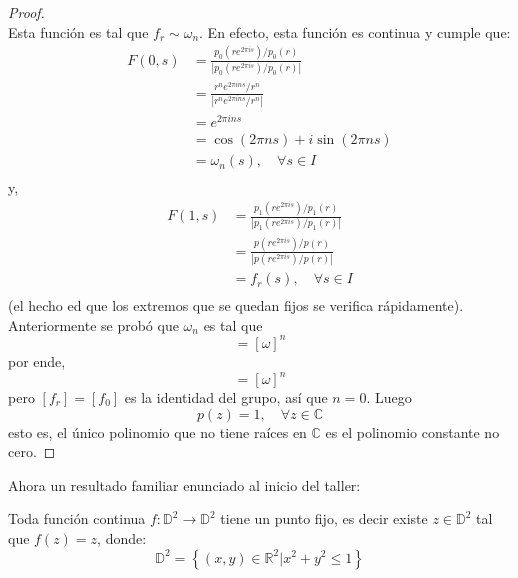\documentclass{article}
\newcounter{it}
\theoremstyle{largebreak}
\newcommand\abs[1]{\ensuremath{\left|#1\right|}}
\newcommand\cf[3]{\ensuremath{#1:#2\rightarrow#3}}
\begin{document}
\begin{proof}
\begin{equation*}
        \end{equation*}
        Esta función es tal que $f_r\sim\omega_n$. En efecto, esta función es continua y cumple que:
        \begin{equation*}
            \begin{split}
                F(0,s)&=\frac{p_0(re^{ 2\pi is})/p_0(r)}{\abs{p_0(re^{ 2\pi is})/p_0(r)}}\\
                &=\frac{r^n e^{ 2\pi ins}/r^n}{\abs{r^n e^{ 2\pi ins}/r^n}}\\
                &=e^{ 2\pi ins}\\
                &=\cos(2\pi ns) +i\sin(2\pi ns)\\
                &=\omega_n(s),\quad\forall s\in I\\ 
            \end{split}
        \end{equation*}
        y,
        \begin{equation*}
            \begin{split}
                F(1,s)&=\frac{p_1(re^{ 2\pi is})/p_1(r)}{\abs{p_1(re^{ 2\pi is})/p_1(r)}}\\
                &=\frac{p(re^{ 2\pi is})/p(r)}{\abs{p(re^{ 2\pi is})/p(r)}}\\
                &=f_r(s),\quad\forall s\in I\\
            \end{split}
        \end{equation*}
        (el hecho ed que los extremos que se quedan fijos se verifica rápidamente). Anteriormente se probó que $\omega_n$ es tal que
        \begin{equation*}
            [\omega_n]=[\omega]^n
        \end{equation*}
        por ende,
        \begin{equation*}
            [f_r]=[\omega]^n
        \end{equation*}
        pero $[f_r]=[f_0]$ es la identidad del grupo, así que $n=0$. Luego
        \begin{equation*}
            p(z)=1,\quad\forall z\in\mathbb{C}
        \end{equation*}
        esto es, el único polinomio que no tiene raíces en $\mathbb{C}$ es el polinomio constante no cero.
    \end{proof}

    Ahora un resultado familiar enunciado al inicio del taller:

    \begin{theor}
        Toda función continua $\cf{f}{\mathbb{D}^2}{\mathbb{D}^2}$ tiene un punto fijo, es decir existe $z\in\mathbb{D}^2$ tal que $f(z)=z$, donde:
        \begin{equation*}
            \mathbb{D}^2=\left\{(x,y)\in\mathbb{R}^2\Big|x^2+y^2\leq1 \right\}
        \end{equation*}
    \end{theor}
\end{document}
